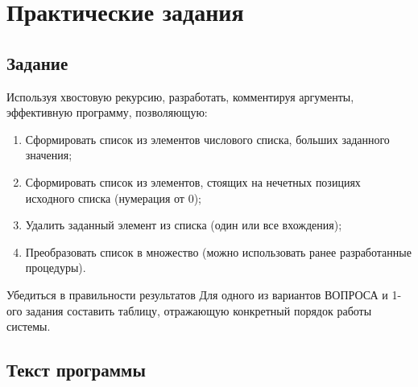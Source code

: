 \chapter{Практические задания}

\section{Задание}

Используя хвостовую рекурсию, разработать, комментируя аргументы, эффективную
программу, позволяющую:

\begin{enumerate}[label=\arabic*)]
    \item Сформировать список из элементов числового списка, больших заданного
        значения;
    \item Сформировать список из элементов, стоящих на нечетных позициях
        исходного списка (нумерация от 0);
    \item Удалить заданный элемент из списка (один или все вхождения);
    \item Преобразовать список в множество (можно использовать ранее
        разработанные процедуры).
\end{enumerate}

Убедиться в правильности результатов
Для одного из вариантов ВОПРОСА и 1-ого задания составить таблицу, отражающую
конкретный порядок работы системы.

\section{Текст программы}


